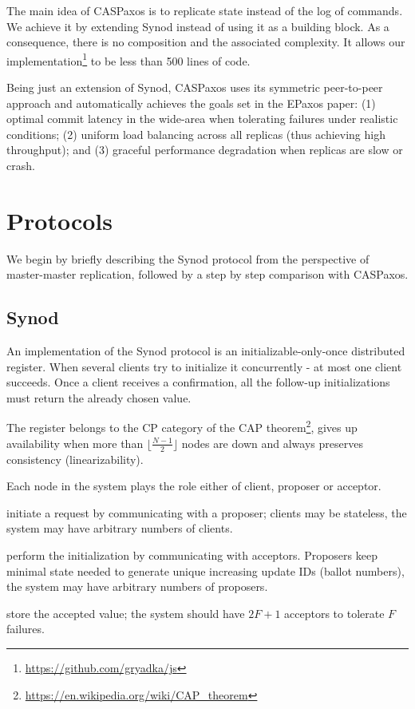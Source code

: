 \documentclass[a4paper,USenglish]{lipics-v2018}
\theoremstyle{definition}
\begin{document}
The main idea of CASPaxos is to replicate state instead of the log of commands. We achieve it by extending Synod instead of using it as a building block. As a consequence, there is no composition and the associated complexity. It allows our implementation\footnote{\href{https://github.com/gryadka/js}{https://github.com/gryadka/js}} to be less than 500 lines of code.

Being just an extension of Synod, CASPaxos uses its symmetric peer-to-peer approach and automatically achieves the goals set in the EPaxos\cite{epaxos} paper: (1) optimal commit latency in the wide-area when tolerating failures under realistic conditions; (2) uniform load balancing across all replicas (thus achieving high throughput); and (3) graceful performance degradation when replicas are slow or crash.

\section{Protocols}

We begin by briefly describing the Synod protocol from the perspective of master-master replication, followed by a step by step comparison with CASPaxos.

\subsection{Synod}

An implementation of the Synod protocol is an initializable-only-once distributed register. When several clients try to initialize it concurrently - at most one client succeeds. Once a client receives a confirmation, all the follow-up initializations must return the already chosen value.

The register belongs to the CP category of the CAP theorem\footnote{\href{https://en.wikipedia.org/wiki/CAP\_theorem}{https://en.wikipedia.org/wiki/CAP\_theorem}}, gives up availability when more than $\lfloor \frac{N-1}2 \rfloor$ nodes are down and always preserves consistency (linearizability).

Each node in the system plays the role either of client, proposer or acceptor.

\begin{description}[align=left]
    \item [Clients] initiate a request by communicating with a proposer; clients may be stateless, the system may have arbitrary numbers of clients.
    \item [Proposers] perform the initialization by communicating with acceptors. Proposers keep minimal state needed to generate unique increasing update IDs (ballot numbers), the system may have arbitrary numbers of proposers.
    \item [Acceptors] store the accepted value; the system should have $2F+1$ acceptors to tolerate $F$ failures.
\end{description}
\end{document}
